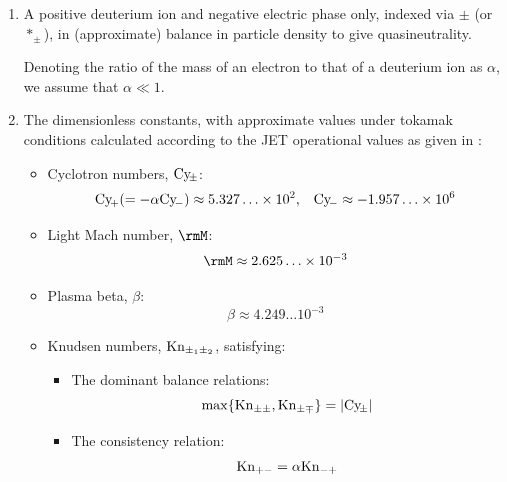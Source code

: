     \shortline

    \begin{enumerate}
        \item  A positive deuterium ion and negative electric phase only, indexed via $\pm$ (or $*_{\pm}$), in (approximate) balance in particle density to give quasineutrality.
        
        Denoting the ratio of the mass of an electron to that of a deuterium ion as $\alpha$, we assume that $\alpha  \ll  1$.

        \item  The dimensionless constants, with approximate values under tokamak conditions calculated according to the JET operational values as given in \cite{Wes00}:
        \begin{itemize}
            \item  Cyclotron numbers, $\mathrm{Cy}\!_{\pm}$:
            \begin{align}
                \mathrm{Cy}\!_{+}  (=  - \alpha\mathrm{Cy}\!_{-})  \approx    5.327\ldots\times 10^{2},  &&
                \mathrm{Cy}\!_{-}                          \approx  - 1.957\ldots\times 10^{6}
            \end{align}
            
            \item  Light Mach number, $\rmM$:
            \begin{equation}
                \rmM  \approx  2.625\ldots\times 10^{- 3}
            \end{equation}
            
            \item  Plasma beta, $\beta$:
            \begin{equation}
                \beta  \approx  4.249\ldots 10^{- 3}
            \end{equation}

            \item  Knudsen numbers, $\mathrm{Kn}_{\pm_{1}\pm_{2}}$, satisfying:
            \begin{itemize}
              \item  The dominant balance relations:
              \begin{equation}
                  \max\{\mathrm{Kn}_{\pm\pm},  \mathrm{Kn}_{\pm\mp}\}  =  |\mathrm{Cy}\!_{\pm}|
              \end{equation}
              
              \item  The consistency relation:
              \begin{equation}
                  \mathrm{Kn}_{+-}  =  \alpha\mathrm{Kn}_{-+}
              \end{equation}
            \end{itemize}
            

\end{itemize}
\end{enumerate}
